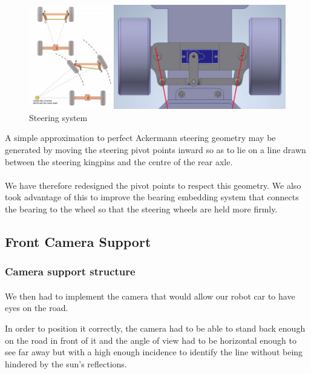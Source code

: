 \begin{figure}[!ht]
    \begin{center}
        \includegraphics[scale=0.45]{Images/steering.jpg}
    \end{center}
    \caption{Steering system}
    \label{fig:steering}
\end{figure}

A simple approximation to perfect Ackermann steering geometry may be generated by
moving the steering pivot points inward so as to lie on a line drawn between the
steering kingpins and the centre of the rear axle.

\paragraph{}
We have therefore redesigned the pivot points to respect this geometry. We also
took advantage of this to improve the bearing embedding system that connects the
bearing to the wheel so that the steering wheels are held more firmly.

\subsection{Front Camera Support}

\subsubsection{Camera support structure}
\paragraph{}
We then had to implement the camera that would allow our robot car to have eyes
on the road.

In order to position it correctly, the camera had to be able to stand back enough
on the road in front of it and the angle of view had to be horizontal enough to see
far away but with a high enough incidence to identify the line without being
hindered by the sun's reflections.

